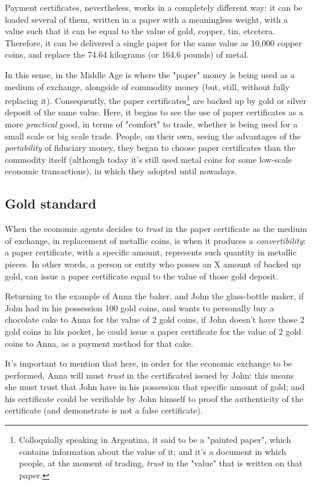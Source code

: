 \documentclass[12pt,a4paper,twoside]{book}
\begin{document}
Payment certificates, nevertheless, works in a completely different way: it can be loaded several of them, written in a paper with a meaningless weight, with a value such that it can be equal to the value of gold, copper, tin, etcetera. Therefore, it can be delivered a single paper for the same value as 10,000 copper coins, and replace the 74.64 kilograms (or 164.6 pounds) of metal.

In this sense, in the Middle Age is where the "paper" money is being used as a medium of exchange, alongside of commodity money (but, still, without fully replacing it). Consequently, the paper certificates\footnote{Colloquially speaking in Argentina, it said to be a "painted paper", which contains information about the value of it; and it's a document in which people, at the moment of trading, \textit{trust} in the "value" that is written on that paper.} are backed up by gold or silver deposit of the same value. Here, it begins to see the use of paper certificates as a more \textit{practical} good, in terms of "comfort" to trade, whether is being used for a small scale or big scale trade. People, on their own, seeing the advantages of the \textit{portability} of fiduciary money, they began to choose paper certificates than the commodity itself (although today it's still used metal coins for some low-scale economic transactions), in which they adopted until nowadays.

\subsection{Gold standard}
When the economic agents decides to \textit{trust} in the paper certificate as the medium of exchange, in replacement of metallic coins, is when it produces a \textit{convertibility}: a paper certificate, with a specific amount, represents such quantity in metallic pieces. In other words, a person or entity who posses an X amount of backed up gold, can issue a paper certificate equal to the value of those gold deposit.

Returning to the example of Anna the baker, and John the glass-bottle maker, if John had in his possession 100 gold coins, and wants to personally buy a chocolate cake to Anna for the value of 2 gold coins, if John doesn't have those 2 gold coins in his pocket, he could issue a paper certificate for the value of 2 gold coins to Anna, as a payment method for that cake.

It's important to mention that here, in order for the economic exchange to be performed, Anna will must \textit{trust} in the certificated issued by John: this means she must trust that John have in his possession that specific amount of gold; and his certificate could be verifiable by John himself to proof the authenticity of the certificate (and demonstrate is not a false certificate).
\end{document}
